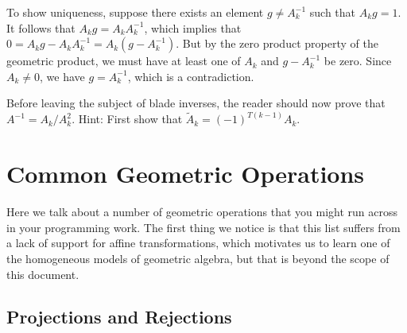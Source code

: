 \documentclass{article}
\begin{document}
To show uniqueness, suppose there exists an element $g\neq A_k^{-1}$
such that $A_kg=1$.  It follows that $A_kg=A_kA_k^{-1}$, which implies
that $0 = A_kg - A_kA_k^{-1} = A_k(g-A_k^{-1})$.  But by the zero
product property of the geometric product, we must have at least
one of $A_k$ and $g-A_k^{-1}$ be zero.  Since $A_k\neq 0$,
we have $g=A_k^{-1}$, which is a contradiction.

Before leaving the subject of blade inverses, the reader
should now prove that $A^{-1}=A_k/A_k^2$.  Hint: First
show that $\tilde{A}_k=(-1)^{T(k-1)}A_k$.

\section{Common Geometric Operations}

Here we talk about a number of geometric operations that you might
run across in your programming work.  The first thing we notice is
that this list suffers from a lack of support for affine transformations,
which motivates us to learn one of the homogeneous models of geometric
algebra, but that is beyond the scope of this document.

\subsection{Projections and Rejections}
\end{document}
